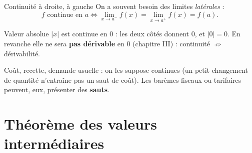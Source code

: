 \documentclass[10pt,aspectratio=169]{beamer}
\numberwithin{dummy}{section}
\begin{document}
\begin{frame}{Continuité à droite, à gauche}
On a souvent besoin des limites \emph{latérales} :
\[
f\text{ continue en }a \iff
\lim_{x\to a^-}f(x)=\lim_{x\to a^+}f(x)=f(a).
\]

\vspace{0.3em}
\begin{exampleblock}{Valeur absolue}
$|x|$ est continue en $0$ : les deux côtés donnent $0$, et $|0|=0$.
En revanche elle ne sera \textbf{pas dérivable} en $0$ (chapitre III) :
continuité $\nRightarrow$ dérivabilité.
\end{exampleblock}

\vspace{0.3em}
\begin{boxgestion}
Coût, recette, demande usuelle : on les suppose continues
(un petit changement de quantité n'entraîne pas un saut de coût).
Les barèmes fiscaux ou tarifaires peuvent, eux, présenter des \textbf{sauts}.
\end{boxgestion}
\end{frame}

\section{Théorème des valeurs intermédiaires}
\end{document}
